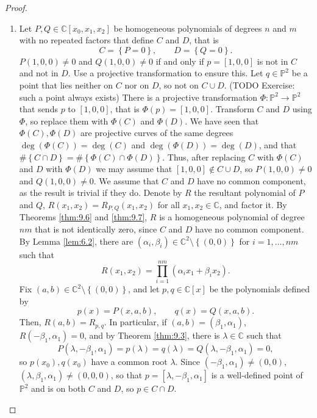 \documentclass{article}
\newcommand{\C}{\mathbb{C}}
\renewcommand{\P}{\mathbb{P}}
\newcommand{\rb}[1]{\left( #1 \right)}
\renewcommand{\sb}[1]{\left[ #1 \right]}
\newcommand{\cb}[1]{\left\{ #1 \right\}}
\theoremstyle{definition}\newtheorem{definition}{Definition}[section]
\theoremstyle{definition}\newtheorem{notation}[definition]{Notation}
\theoremstyle{definition}\newtheorem{remark}[definition]{Remark}
\theoremstyle{definition}\newtheorem{example}[definition]{Example}
\theoremstyle{definition}\newtheorem{fact}{Fact}
\theoremstyle{definition}\newtheorem{exercise}{Exercise}
\begin{document}
\begin{proof}
\hfill
\begin{enumerate}
\item Let $ P, Q \in \C\sb{x_0, x_1, x_2} $ be homogeneous polynomials of degrees $ n $ and $ m $ with no repeated factors that define $ C $ and $ D $, that is
$$ C = \cb{P = 0}, \qquad D = \cb{Q = 0}. $$
$ P\rb{1, 0, 0} \ne 0 $ and $ Q\rb{1, 0, 0} \ne 0 $ if and only if $ p = \sb{1, 0, 0} $ is not in $ C $ and not in $ D $. Use a projective transformation to ensure this. Let $ q \in \P^2 $ be a point that lies neither on $ C $ nor on $ D $, so not on $ C \cup D $. (TODO Exercise: such a point always exists) There is a projective transformation $ \Phi : \P^2 \to \P^2 $ that sends $ p $ to $ \sb{1, 0, 0} $, that is $ \Phi\rb{p} = \sb{1, 0, 0} $. Transform $ C $ and $ D $ using $ \Phi $, so replace them with $ \Phi\rb{C} $ and $ \Phi\rb{D} $. We have seen that $ \Phi\rb{C}, \Phi\rb{D} $ are projective curves of the same degrees $ \deg\rb{\Phi\rb{C}} = \deg\rb{C} $ and $ \deg\rb{\Phi\rb{D}} = \deg\rb{D} $, and that $ \#\cb{C \cap D} = \#\cb{\Phi\rb{C} \cap \Phi\rb{D}} $. Thus, after replacing $ C $ with $ \Phi\rb{C} $ and $ D $ with $ \Phi\rb{D} $ we may assume that $ \sb{1, 0, 0} \notin C \cup D $, so $ P\rb{1, 0, 0} \ne 0 $ and $ Q\rb{1, 0, 0} \ne 0 $. We assume that $ C $ and $ D $ have no common component, as the result is trivial if they do. Denote by $ R $ the resultant polynomial of $ P $ and $ Q $, $ R\rb{x_1, x_2} = R_{P, Q}\rb{x_1, x_2} $ for all $ x_1, x_2 \in \C $, and factor it. By Theorems \ref{thm:9.6} and \ref{thm:9.7}, $ R $ is a homogeneous polynomial of degree $ nm $ that is not identically zero, since $ C $ and $ D $ have no common component. By Lemma \ref{lem:6.2}, there are $ \rb{\alpha_i, \beta_i} \in \C^2 \setminus \cb{\rb{0, 0}} $ for $ i = 1, \dots, nm $ such that
$$ R\rb{x_1, x_2} = \prod_{i = 1}^{nm} \rb{\alpha_ix_1 + \beta_ix_2}. $$
Fix $ \rb{a, b} \in \C^2 \setminus \cb{\rb{0, 0}} $, and let $ p, q \in \C\sb{x} $ be the polynomials defined by
$$ p\rb{x} = P\rb{x, a, b}, \qquad q\rb{x} = Q\rb{x, a, b}. $$
Then, $ R\rb{a, b} = R_{p, q} $. In particular, if $ \rb{a, b} = \rb{\beta_1, \alpha_1} $, $ R\rb{-\beta_1, \alpha_1} = 0 $, and by Theorem \ref{thm:9.3}, there is $ \lambda \in \C $ such that
$$ P\rb{\lambda, -\beta_1, \alpha_1} = p\rb{\lambda} = q\rb{\lambda} = Q\rb{\lambda, -\beta_1, \alpha_1} = 0, $$
so $ p\rb{x_0}, q\rb{x_0} $ have a common root $ \lambda $. Since $ \rb{-\beta_1, \alpha_1} \ne \rb{0, 0} $, $ \rb{\lambda, \beta_1, \alpha_1} \ne \rb{0, 0, 0} $, so that $ p = \sb{\lambda, -\beta_1, \alpha_1} $ is a well-defined point of $ \P^2 $ and is on both $ C $ and $ D $, so $ p \in C \cap D $.


\end{enumerate}
\end{proof}
\end{document}
